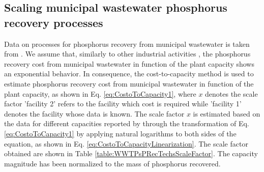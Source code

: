 \documentclass[authoryear]{elsarticle}
\begin{document}
\subsection{Scaling municipal wastewater phosphorus recovery processes}
Data on processes for phosphorus recovery from municipal wastewater is taken from \citet{egle_phosphorus_2016}. We assume that, similarly to other industrial activities \citep{dysert2005so}, the phosphorus recovery cost from municipal wastewater in function of the plant capacity shows an exponential behavior. In consequence, the cost-to-capacity method \citep{baumann2014cost} is used to estimate phosphorus recovery cost from municipal wastewater in function of the plant capacity, as shown in Eq. \ref{eq:CostoToCapacity1}, where $x$ denotes the scale factor 'facility 2' refers to the facility which cost is required while 'facility 1' denotes the facility whose data is known. The scale factor $x$ is estimated based on the data for different capacities reported by \citet{egle_phosphorus_2016} through the transformation of Eq. \ref{eq:CostoToCapacity1} by applying natural logarithms to both sides of the equation, as shown in Eq. \ref{eq:CostoToCapacityLinearization}. The scale factor obtained are shown in Table \ref{table:WWTPsPRecTechsScaleFactor}. The capacity magnitude has been normalized to the mass of phosphorus recovered.
\end{document}
